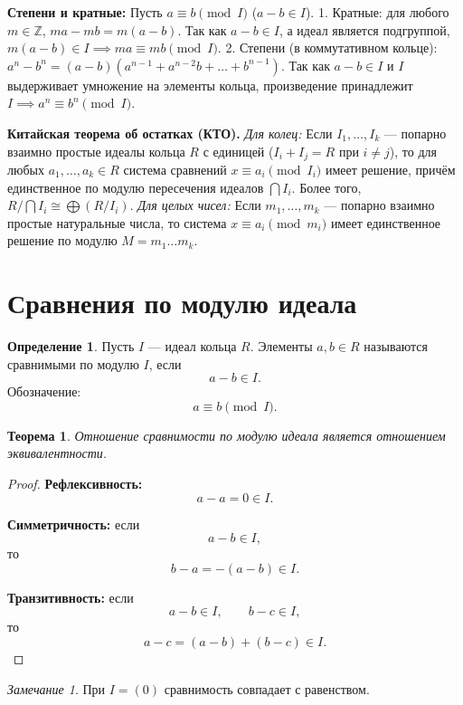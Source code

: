 \documentclass[12pt, a4paper]{article}
\newtheorem{theorem}{Теорема}
\theoremstyle{definition}
\newtheorem{definition}{Определение}
\theoremstyle{remark}
\newtheorem*{remark}{Замечание}
\begin{document}
\textbf{Степени и кратные:} Пусть $a \equiv b \pmod I$ ($a - b \in I$).
1. Кратные: для любого $m \in \mathbb{Z}$, $ma - mb = m(a-b)$. Так как $a-b \in I$, а идеал является подгруппой, $m(a-b) \in I \implies ma \equiv mb \pmod I$.
2. Степени (в коммутативном кольце): $a^n - b^n = (a-b)(a^{n-1} + a^{n-2}b + \dots + b^{n-1})$. Так как $a-b \in I$ и $I$ выдерживает умножение на элементы кольца, произведение принадлежит $I \implies a^n \equiv b^n \pmod I$.

\textbf{Китайская теорема об остатках (КТО).} 
\textit{Для колец:} Если $I_1, \dots, I_k$ — попарно взаимно простые идеалы кольца $R$ с единицей ($I_i + I_j = R$ при $i \neq j$), то для любых $a_1, \dots, a_k \in R$ система сравнений $x \equiv a_i \pmod{I_i}$ имеет решение, причём единственное по модулю пересечения идеалов $\bigcap I_i$. Более того, $R / \bigcap I_i \cong \bigoplus (R / I_i)$.
\textit{Для целых чисел:} Если $m_1, \dots, m_k$ — попарно взаимно простые натуральные числа, то система $x \equiv a_i \pmod{m_i}$ имеет единственное решение по модулю $M = m_1 \dots m_k$.

\section{Сравнения по модулю идеала}

\begin{definition}
	Пусть $I$ --- идеал кольца $R$. Элементы $a,b\in R$ называются сравнимыми по модулю $I$, если
	\[
	a-b\in I.
	\]
	Обозначение:
	\[
	a\equiv b\pmod I.
	\]
\end{definition}

\begin{theorem}
	Отношение сравнимости по модулю идеала является отношением эквивалентности.
\end{theorem}

\begin{proof}
	\textbf{Рефлексивность:}
	\[
	a-a=0\in I.
	\]
	
	\textbf{Симметричность:}
	если
	\[
	a-b\in I,
	\]
	то
	\[
	b-a=-(a-b)\in I.
	\]
	
	\textbf{Транзитивность:}
	если
	\[
	a-b\in I,\qquad b-c\in I,
	\]
	то
	\[
	a-c=(a-b)+(b-c)\in I.
	\]
\end{proof}

\begin{remark}
	При $I=(0)$ сравнимость совпадает с равенством.
\end{remark}
\end{document}
